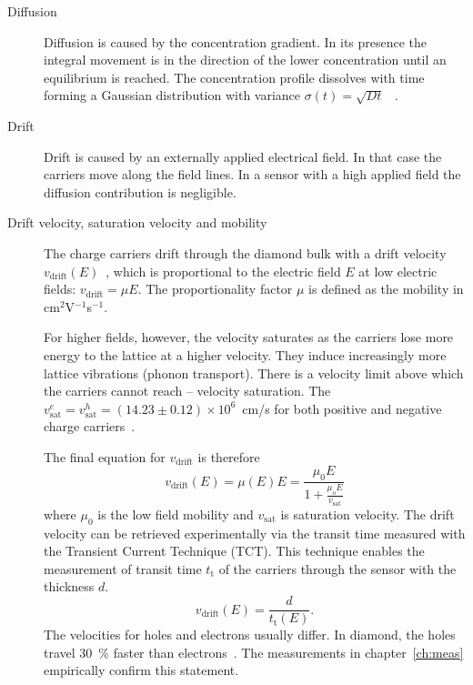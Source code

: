 \begin{description}

\item[Diffusion]
Diffusion is caused by the concentration gradient. In its presence the integral movement is in the direction of the lower concentration until an equilibrium is reached.
The concentration profile dissolves with time forming a Gaussian distribution with variance $\sigma(t)=\sqrt{Dt}$~\cite{} .

\item[Drift]
Drift is caused by an externally applied electrical field. In that case the carriers move along the field lines. In a sensor with a high applied field the diffusion contribution is negligible. 

\item[Drift velocity, saturation velocity and mobility]
The charge carriers drift through the diamond bulk with a drift velocity $v_\mathrm{drift}(E)$~\cite{}, which is proportional to the electric field $E$ at low electric fields: $v_\mathrm{drift} = \mu E$. The proportionality factor $\mu$ is defined as the mobility in cm$^2$V$^{-1}$s$^{-1}$.

For higher fields, however, the velocity saturates as the carriers lose more energy to the lattice at a higher velocity. They induce increasingly more lattice vibrations (phonon transport). There is a velocity limit above which the carriers cannot reach -- velocity saturation. The $v^e_\mathrm{sat}=v^h_\mathrm{sat}=(14.23\pm0.12)\times10^6$~cm/s for both positive and negative charge carriers~\cite{JANSEN:00001}.

The final equation for $v_\mathrm{drift}$ is therefore
\begin{equation}
\label{eq:vsat}
v_\mathrm{drift}(E) = \mu(E)E= \frac{\mu_\mathrm{0} E}{1 + \frac{\mu_\mathrm{o} E}{v_\mathrm{sat}}}
\end{equation}
where $\mu_\mathrm{0}$ is the low field mobility and $v_\mathrm{sat}$ is saturation velocity. The drift velocity can be retrieved experimentally via the transit time measured with the Transient Current Technique (TCT). This technique enables the measurement of transit time $t_\mathrm{t}$ of the carriers through the sensor with the thickness $d$. 
\begin{equation}
\label{eq:vsat}
v_\mathrm{drift}(E) = \frac{d}{t_\mathrm{t}(E)}.
\end{equation}
The velocities for holes and electrons usually differ. In diamond, the holes travel 30~\% faster than electrons~\cite{}. The measurements in chapter~\ref{ch:meas} empirically confirm this statement.


\end{description}

